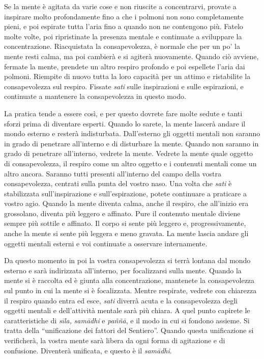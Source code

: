 Se la mente è agitata da varie cose e non riuscite a concentrarvi,
provate a inspirare molto profondamente fino a che i polmoni non sono
completamente pieni, e poi espirate tutta l'aria fino a quando non ne
contengono più. Fatelo molte volte, poi ripristinate la presenza mentale
e continuate a sviluppare la concentrazione. Riacquistata la
consapevolezza, è normale che per un po' la mente resti calma, ma poi
cambierà e si agiterà nuovamente. Quando ciò avviene, fermate la mente,
prendete un altro respiro profondo e poi espellete l'aria dai polmoni.
Riempite di nuovo tutta la loro capacità per un attimo e ristabilite la
consapevolezza sul respiro. Fissate \emph{sati} sulle inspirazioni e
sulle espirazioni, e continuate a mantenere la consapevolezza in questo
modo.

La pratica tende a essere così, e per questo dovrete fare molte sedute e
tanti sforzi prima di diventare esperti. Quando lo sarete, la mente
lascerà andare il mondo esterno e resterà indisturbata. Dall'esterno gli
oggetti mentali non saranno in grado di penetrare all'interno e di
disturbare la mente. Quando non saranno in grado di penetrare
all'interno, vedrete la mente. Vedrete la mente quale oggetto di
consapevolezza, il respiro come un altro oggetto e i contenuti mentali
come un altro ancora. Saranno tutti presenti all'interno del campo della
vostra consapevolezza, centrati sulla punta del vostro naso. Una volta
che \emph{sati} è stabilizzata sull'inspirazione e sull'espirazione,
potete continuare a praticare a vostro agio. Quando la mente diventa
calma, anche il respiro, che all'inizio era grossolano, diventa più
leggero e affinato. Pure il contenuto mentale diviene sempre più sottile
e affinato. Il corpo si sente più leggero e, progressivamente, anche la
mente si sente più leggera e meno gravata. La mente lascia andare gli
oggetti mentali esterni e voi continuate a osservare internamente.

Da questo momento in poi la vostra consapevolezza si terrà lontana dal
mondo esterno e sarà indirizzata all'interno, per focalizzarsi sulla
mente. Quando la mente si è raccolta ed è giunta alla concentrazione,
mantenete la consapevolezza sul punto in cui la mente si è focalizzata.
Mentre respirate, vedrete con chiarezza il respiro quando entra ed esce,
\emph{sati} diverrà acuta e la consapevolezza degli oggetti mentali e
dell'attività mentale sarà più chiara. A quel punto capirete le
caratteristiche di \emph{sīla,} \emph{samādhi} e \emph{paññā}, e il modo
in cui si fondono assieme. Si tratta della ``unificazione dei fattori
del Sentiero''. Quando questa unificazione si verificherà, la vostra
mente sarà libera da ogni forma di agitazione e di confusione. Diventerà
unificata, e questo è il \emph{samādhi}.

